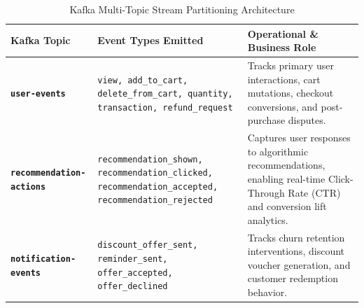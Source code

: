 \documentclass[11pt,a4paper]{article}
\begin{document}
\begin{table}[h]
\centering
\small
\begin{tabularx}{\textwidth}{@{}>{\bfseries}p{3.5cm}p{4.2cm}X@{}}
\toprule
\color{DeepNavy}Kafka Topic & \color{DeepNavy}Event Types Emitted & \color{DeepNavy}Operational \& Business Role \\
\midrule
\texttt{user-events} & \texttt{view, add\_to\_cart, delete\_from\_cart, quantity, transaction, refund\_request} & Tracks primary user interactions, cart mutations, checkout conversions, and post-purchase disputes. \\
\addlinespace
\texttt{recommendation-actions} & \texttt{recommendation\_shown, recommendation\_clicked, recommendation\_accepted, recommendation\_rejected} & Captures user responses to algorithmic recommendations, enabling real-time Click-Through Rate (CTR) and conversion lift analytics. \\
\addlinespace
\texttt{notification-events} & \texttt{discount\_offer\_sent, reminder\_sent, offer\_accepted, offer\_declined} & Tracks churn retention interventions, discount voucher generation, and customer redemption behavior. \\
\bottomrule
\end{tabularx}
\caption{Kafka Multi-Topic Stream Partitioning Architecture}
\end{table}
\end{document}
